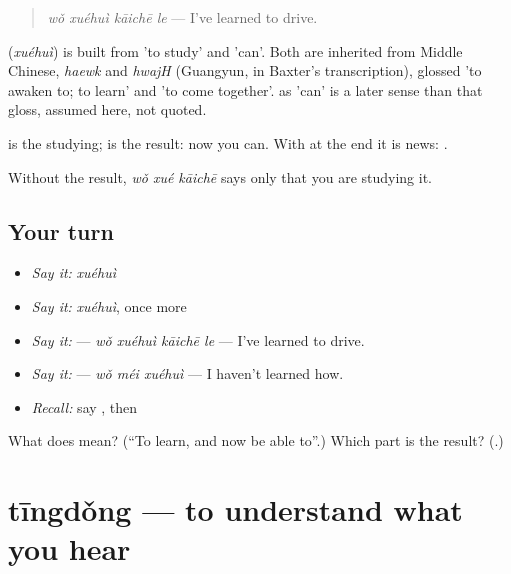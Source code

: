 \begin{quote}
\textbf{} \emph{wǒ xuéhuì kāichē le} — I've learned to drive.
\end{quote}

\begin{cousinweb}
\textbf{} (\emph{xuéhuì}) is built from  'to study' and  'can'. Both are inherited from Middle Chinese, \emph{haewk} and \emph{hwajH} (Guangyun, in Baxter's transcription), glossed 'to awaken to; to learn' and 'to come together'.  as 'can' is a later sense than that gloss, assumed here, not quoted.
\end{cousinweb}

\begin{grammarlens}[title={What you've built}]
 is the studying;  is the result: now you can. With  at the end it is news: .

Without the result, \textbf{} \emph{wǒ xué kāichē} says only that you are studying it.
\end{grammarlens}

\subsection*{Your turn}
\begin{itemize}
\raggedright
  \item \emph{Say it:} \emph{xuéhuì}
  \item \emph{Say it:} \emph{xuéhuì}, once more
  \item \emph{Say it:}  — \emph{wǒ xuéhuì kāichē le} — I've learned to drive.
  \item \emph{Say it:}  — \emph{wǒ méi xuéhuì} — I haven't learned how.
  \item \emph{Recall:} say , then 
\end{itemize}

\begin{tcolorbox}[breakable,colback=teal!4,colframe=teal!35!black,title={Before you move on}]
What does  mean? (\textquotedblleft{}To learn, and now be able to\textquotedblright{}.) Which part is the result? (\textbf{}.)
\end{tcolorbox}
\section[tīngdǒng]{tīngdǒng — to understand what you hear}

